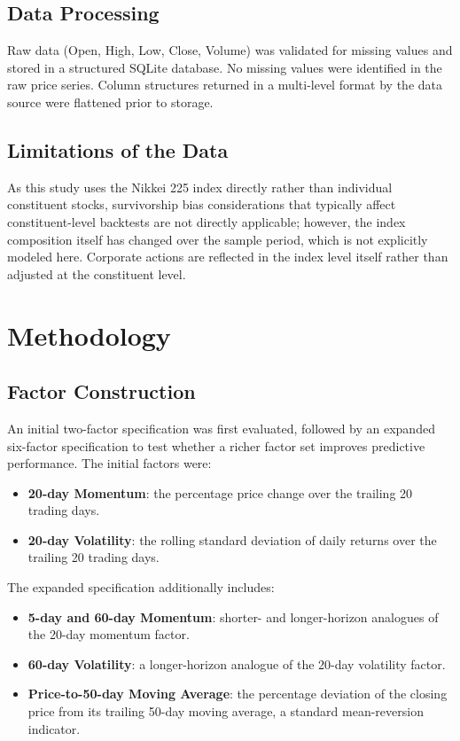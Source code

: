 \documentclass[11pt]{article}
\begin{document}
\subsection{Data Processing}
Raw data (Open, High, Low, Close, Volume) was validated for missing values and stored in a structured SQLite database. No missing values were identified in the raw price series. Column structures returned in a multi-level format by the data source were flattened prior to storage.

\subsection{Limitations of the Data}
As this study uses the Nikkei 225 index directly rather than individual constituent stocks, survivorship bias considerations that typically affect constituent-level backtests are not directly applicable; however, the index composition itself has changed over the sample period, which is not explicitly modeled here. Corporate actions are reflected in the index level itself rather than adjusted at the constituent level.

\section{Methodology}

\subsection{Factor Construction}
An initial two-factor specification was first evaluated, followed by an expanded six-factor specification to test whether a richer factor set improves predictive performance. The initial factors were:
\begin{itemize}
    \item \textbf{20-day Momentum}: the percentage price change over the trailing 20 trading days.
    \item \textbf{20-day Volatility}: the rolling standard deviation of daily returns over the trailing 20 trading days.
\end{itemize}

The expanded specification additionally includes:
\begin{itemize}
    \item \textbf{5-day and 60-day Momentum}: shorter- and longer-horizon analogues of the 20-day momentum factor.
    \item \textbf{60-day Volatility}: a longer-horizon analogue of the 20-day volatility factor.
    \item \textbf{Price-to-50-day Moving Average}: the percentage deviation of the closing price from its trailing 50-day moving average, a standard mean-reversion indicator.
\end{itemize}
\end{document}
